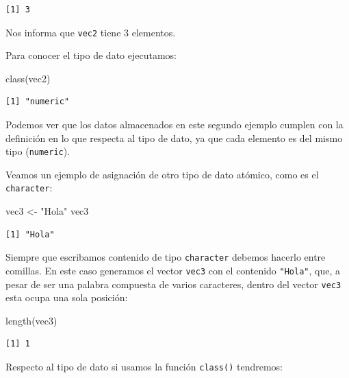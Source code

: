 \documentclass[
  spanish,
  a4paper,
]{scrbook}
\newenvironment{Shaded}{\begin{snugshade}}{\end{snugshade}}
\newcommand{\FunctionTok}[1]{\textcolor[rgb]{0.28,0.35,0.67}{#1}}
\newcommand{\NormalTok}[1]{\textcolor[rgb]{0.00,0.23,0.31}{#1}}
\newcommand{\OtherTok}[1]{\textcolor[rgb]{0.00,0.23,0.31}{#1}}
\newcommand{\StringTok}[1]{\textcolor[rgb]{0.13,0.47,0.30}{#1}}
\begin{document}
\begin{verbatim}
[1] 3
\end{verbatim}

Nos informa que \texttt{vec2} tiene 3 elementos.

Para conocer el tipo de dato ejecutamos:

\begin{Shaded}
\begin{Highlighting}[]
\FunctionTok{class}\NormalTok{(vec2)}
\end{Highlighting}
\end{Shaded}

\begin{verbatim}
[1] "numeric"
\end{verbatim}

Podemos ver que los datos almacenados en este segundo ejemplo cumplen
con la definición en lo que respecta al tipo de dato, ya que cada
elemento es del mismo tipo (\texttt{numeric}).

Veamos un ejemplo de asignación de otro tipo de dato atómico, como es el
\texttt{character}:

\begin{Shaded}
\begin{Highlighting}[]
\NormalTok{vec3 }\OtherTok{\textless{}{-}} \StringTok{"Hola"}
\NormalTok{vec3}
\end{Highlighting}
\end{Shaded}

\begin{verbatim}
[1] "Hola"
\end{verbatim}

Siempre que escribamos contenido de tipo \texttt{character} debemos
hacerlo entre comillas. En este caso generamos el vector \texttt{vec3}
con el contenido \texttt{"Hola"}, que, a pesar de ser una palabra
compuesta de varios caracteres, dentro del vector \texttt{vec3} esta
ocupa una sola posición:

\begin{Shaded}
\begin{Highlighting}[]
\FunctionTok{length}\NormalTok{(vec3)}
\end{Highlighting}
\end{Shaded}

\begin{verbatim}
[1] 1
\end{verbatim}

Respecto al tipo de dato si usamos la función \texttt{class()}
tendremos:
\end{document}
